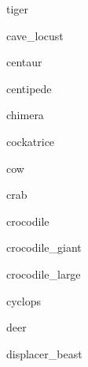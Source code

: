 \documentclass[letterpaper,serif]{module}
\begin{document}
\begin{newmonster}{tiger}\end{newmonster}

\begin{newmonster}{cave_locust}\end{newmonster}

\begin{newmonster}{centaur}\end{newmonster}

\begin{newmonster}{centipede}\end{newmonster}

\begin{newmonster}{chimera}\end{newmonster}

\begin{newmonster}{cockatrice}\end{newmonster}

\begin{newmonster}{cow}\end{newmonster}

\begin{newmonster}{crab}\end{newmonster}

\begin{newmonster}{crocodile}\end{newmonster}

\begin{newmonster}{crocodile_giant}\end{newmonster}

\begin{newmonster}{crocodile_large}\end{newmonster}

\begin{newmonster}{cyclops}\end{newmonster}

\begin{newmonster}{deer}\end{newmonster}

\begin{newmonster}{displacer_beast}\end{newmonster}
\end{document}
